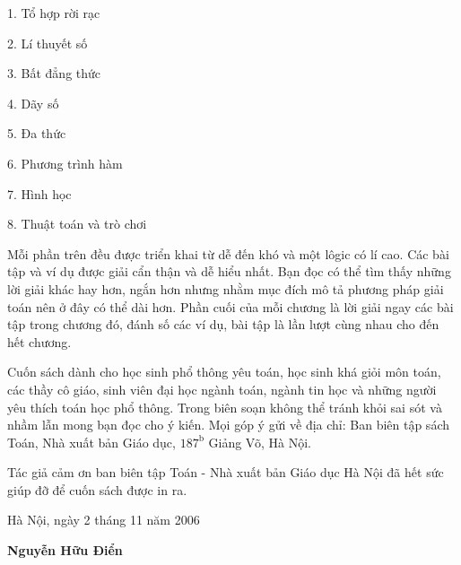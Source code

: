 1. Tổ hợp rời rạc

2. Lí thuyết số

3. Bất đẳng thức

4. Dãy số

5. Đa thức

6. Phương trình hàm

7. Hình học

8. Thuật toán và trò chơi

Mỗi phần trên đều được triển khai từ dễ đến khó và một lôgic có lí cao. Các bài tập và ví dụ được giải cẩn thận và dễ hiểu nhất. Bạn đọc có thể tìm thấy những lời giải khác hay hơn, ngắn hơn nhưng nhằm mục đích mô tả phương pháp giải toán nên ở đây có thể dài hơn. Phần cuối của mỗi chương là lời giải ngay các bài tập trong chương đó, đánh số các ví dụ, bài tập là lần lượt cùng nhau cho đến hết chương.
 
Cuốn sách dành cho học sinh phổ thông yêu toán, học sinh khá giỏi môn toán, 
các thầy cô giáo, sinh viên đại học ngành toán, ngành tin học 
và những người yêu thích toán học phổ thông. 
Trong biên soạn không thể tránh khỏi sai sót và nhầm lẫn mong bạn đọc cho ý kiến.
 Mọi góp ý gửi về địa chỉ: Ban biên tập sách Toán, Nhà xuất bản Giáo dục, $187^{\mbox{b}}$ Giảng Võ, Hà Nội.
 
Tác giả cảm ơn ban biên tập Toán - Nhà xuất bản Giáo dục Hà Nội đã hết sức giúp đỡ để cuốn sách được in ra. 
 
\hfill Hà Nội, ngày 2 tháng 11 năm  2006

\hfill {\bf Nguyễn Hữu Điển}\hspace{0.5cm}
